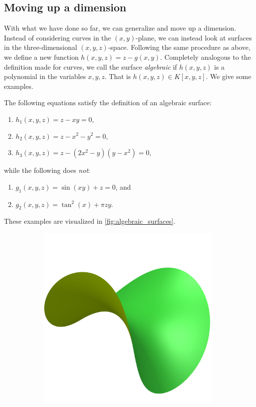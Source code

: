 \documentclass{article}
\begin{document}
    \subsection{Moving up a dimension}
    \label{sub:moving_up_a_dimension}
    With what we have done so far, we can generalize and move up a dimension.
    Instead of considering curves in the $(x, y)$-plane, we can instead look at
    surfaces in the three-dimensional $(x, y, z)$-space. Following the same
    procedure as above, we define a new function $h(x, y, z) = z - g(x, y)$.
    Completely analogous to the definition made for curves, we call the surface
    \emph{algebraic} if $h(x, y, z)$ is a polynomial in the variables $x, y,
    z$. That is $h(x, y, z) \in K[x, y, z]$. We give some examples.

    \begin{example}
        \label{exmpl:algebraic_surfaces}
        The following equations satisfy the definition of an algebraic surface:
        \begin{enumerate}
            \item $h_1(x, y, z) = z - xy = 0$,
            \item $h_2(x, y, z) = z - x^2 - y^2 = 0$,
            \item $h_3(x, y, z) = z - (2x^2 - y)(y - x^2) = 0$,
        \end{enumerate}
        while the following does \emph{not}:
        \begin{enumerate}[resume]
            \item $g_1(x, y, z) = \sin(xy) + z = 0$, and
            \item $g_2(x, y, z) = \tan^2(x) + \pi z y$.
        \end{enumerate}
        These examples are visualized in \cref{fig:algebraic_surfaces}.
        \begin{figure}[]
            \centering
            \begin{subfigure}[t]{0.3\textwidth}
                \includegraphics[height=0.6\textwidth]{pictures/example_one.png} 

\end{subfigure}
\end{figure}
\end{example}
\end{document}
